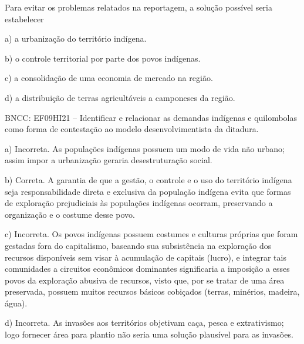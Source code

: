 Para evitar os problemas relatados na reportagem, a solução possível
seria estabelecer

a)  a urbanização do território indígena.

b)  o controle territorial por parte dos povos indígenas.

c)  a consolidação de uma economia de mercado na região.

d)  a distribuição de terras agricultáveis a camponeses da região.

BNCC: EF09HI21 -- Identificar e relacionar as demandas indígenas e quilombolas
como forma de contestação ao modelo desenvolvimentista da ditadura.

a) Incorreta. As populações indígenas possuem um modo de vida não urbano;
assim impor a urbanização geraria desestruturação social.

b) Correta. A garantia de que a gestão, o controle e o uso do território
indígena seja responsabilidade direta e exclusiva da população indígena
evita que formas de exploração prejudiciais às populações indígenas
ocorram, preservando a organização e o costume desse povo.

c) Incorreta. Os povos indígenas possuem costumes e culturas próprias que
foram gestadas fora do capitalismo, baseando sua subsistência na
exploração dos recursos disponíveis sem visar à acumulação de capitais
(lucro), e integrar tais comunidades a circuitos econômicos dominantes
significaria a imposição a esses povos da exploração abusiva de recursos, visto que, por se tratar de uma área preservada, possuem muitos
recursos básicos cobiçados (terras, minérios, madeira, água).

d) Incorreta. As invasões aos territórios objetivam caça, pesca e
extrativismo; logo fornecer área para plantio não seria uma solução
plausível para as invasões.